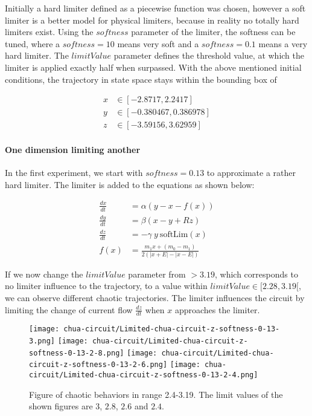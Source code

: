 \documentclass[main]{subfiles}
\begin{document}
Initially a hard limiter defined as a piecewise function was chosen, however a soft limiter is a better model for physical limiters, because in reality no totally hard limiters exist. Using the $softness$ parameter of the limiter, the softness can be tuned, where a \(softness = 10\) means very soft and a \(softness = 0.1\) means a very hard limiter. The $limitValue$ parameter defines the threshold value, at which the limiter is applied exactly half when surpassed. With the above mentioned initial conditions, the trajectory in state space stays within the bounding box of 

\begin{align*}
x &\in [-2.8717,2.2417]\\
y &\in [-0.380467,0.386978]\\
z &\in [-3.59156,3.62959]
\end{align*}

\paragraph{One dimension limiting another}

In the first experiment, we start with \(softness=0.13\) to approximate a rather hard limiter. The limiter is added to the equations as shown below:

\begin{align*}
\frac{dx}{dt}&=\alpha (y-x-f(x)) \\
\frac{dy}{dt}&=\beta (x-y + Rz)\\
\frac{dz}{dt}&=-\gamma ~ y ~ \text{softLim}(x)\\
f (x) &= \frac{m_1 x + (m_0 - m_1)}{2 (| x + E | -| x - E |)}
\end{align*}

If we now change the $limitValue$ parameter from \(>3.19\), which corresponds to no limiter influence to the trajectory, to a value within \(limitValue \in [2.28,3.19[\), we can observe different chaotic trajectories. The limiter influences the circuit by limiting the change of current flow \(\frac{dz}{dt}\) when \(x\) approaches the limiter.

\begin{figure}[H]
\centering
\texttt{[image: chua-circuit/Limited-chua-circuit-z-softness-0-13-3.png]}
\texttt{[image: chua-circuit/Limited-chua-circuit-z-softness-0-13-2-8.png]}
\texttt{[image: chua-circuit/Limited-chua-circuit-z-softness-0-13-2-6.png]}
\texttt{[image: chua-circuit/Limited-chua-circuit-z-softness-0-13-2-4.png]}
\caption[Figure of chaotic behaviors in range 2.4-3.19]{Figure of chaotic behaviors in range 2.4-3.19. The limit values of the shown figures are \(3\), \(2.8\), \(2.6\) and \(2.4\).}
\label{figure:z-2.4-3.19-chaotictrajectories}
\end{figure}
\end{document}
